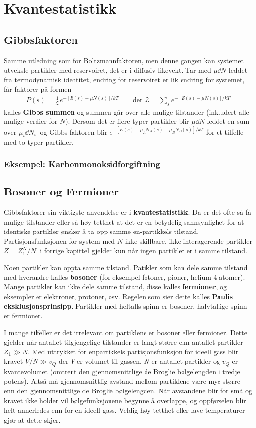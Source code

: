 \documentclass[12pt]{article}
\begin{document}
\section{Kvantestatistikk}
\subsection{Gibbsfaktoren}
Samme utledning som for Boltzmannfaktoren, men denne gangen kan systemet utveksle
partikler med reservoiret, det er i diffusiv likevekt. Tar med $\mu \dd N$ leddet
fra termodynamisk identitet, endring for reservoiret er lik endring for systemet, får
faktorer på formen
\begin{align*}
  P(s) = \frac{1}{\mathcal{Z}} e^{-[E(s) - \mu N(s)]/kT} \qquad \text{der } \mathcal{Z} = \sum_s e^{-[E(s) - \mu N(s)]/kT}
\end{align*}
kalles \textbf{Gibbs summen} og summen går over alle mulige tilstander (inkludert alle mulige verdier for $N$).
Dersom det er flere typer partikler blir $\mu \dd N$ leddet en sum over $\mu_i \dd N_i$, og Gibbs faktoren blir
$e^{-[E(s) - \mu_A N_A(s) - \mu_B N_B(s)]/kT}$ for et tilfelle med to typer partikler.
\subsubsection{Eksempel: Karbonmonoksidforgiftning}

\subsection{Bosoner og Fermioner}
Gibbsfaktorer sin viktigste anvendelse er i \textbf{kvantestatistikk}. Da er det ofte
så få mulige tilstander eller så høy tetthet at det er en betydelig sannsynlighet
for at identiske partikler ønsker å ta opp samme en-partikkels tilstand. Partisjonsfunksjonen
for system med $N$ ikke-skillbare, ikke-interagerende partikler $Z = Z_1^N / N!$ i forrige
kapittel gjelder kun når ingen partikler er i samme tilstand.

Noen partikler kan oppta samme tilstand. Patikler som kan dele samme tilstand
med hverandre kalles \textbf{bosoner} (for eksempel fotoner, pioner, helium-4 atomer).
Mange partikler kan ikke dele samme tilstand, disse kalles \textbf{fermioner}, og
eksempler er elektroner, protoner, osv. Regelen som sier dette kalles \textbf{Paulis eksklusjonsprinsipp}.
Partikler med heltalls spinn er bosoner, halvtallige spinn er fermioner.

I mange tilfeller er det irrelevant om partiklene er bosoner eller fermioner. Dette gjelder
når antallet tilgjengelige tilstander er langt større enn antallet partikler $Z_1 \gg N$.
Med uttrykket for enpartikkels partisjonsfunksjon for ideell gass blir kravet $V/N \gg v_Q$
der $V$ er volumet til gassen, $N$ er antallet partikler og $v_Q$ er kvantevolumet (omtrent
den gjennomsnittlige de Broglie bølgelengden i tredje potens). Altså må gjennomsnittlig
avstand mellom partiklene være mye større enn den gjennomsnittlige de Broglie bølgelengden.
Når avstandene blir for små og kravet ikke holder vil bølgefunksjonene begynne å overlappe,
og oppførselen blir helt annerledes enn for en ideell gass. Veldig høy tetthet eller
lave temperaturer gjør at dette skjer.
\end{document}

